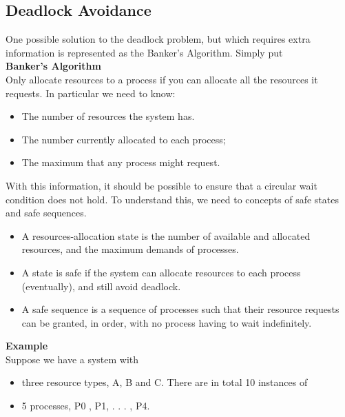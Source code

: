 \documentclass[a4paper, 10pt]{article}
\begin{document}
\subsection{Deadlock Avoidance}
One possible solution to the deadlock problem, but which requires extra
information is represented as the Banker's Algorithm. Simply put \\[2ex]
\textbf{Banker's Algorithm} \\
Only allocate resources to a process if you can allocate all the resources it requests. In particular we need to know:
\begin{itemize}
    \item The number of resources the system has.
    \item The number currently allocated to each process;
    \item The maximum that any process might request.
\end{itemize}
With this information, it should be possible to ensure that a circular wait condition does not hold. To understand this, we need to concepts of safe states and safe sequences.
\begin{itemize}
    \item A resources-allocation state is the number of available and allocated resources, and the maximum demands of processes.
    \item A state is safe if the system can allocate resources to each process (eventually), and still avoid deadlock.
    \item A safe sequence is a sequence of processes such that their resource requests can be granted, in order, with no process having to wait indefinitely.
\end{itemize}
\textbf{Example} \\
Suppose we have a system with
\begin{itemize}
    \item three resource types, A, B and C. There are in total 10 instances of
    \item  5 processes, P0 , P1, . . . , P4.
\end{itemize}
\end{document}
